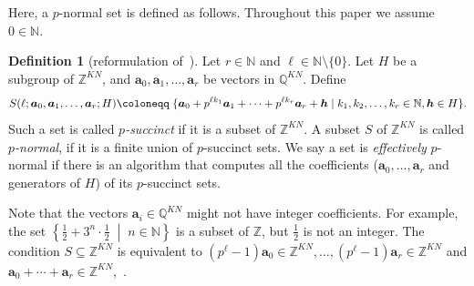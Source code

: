 \documentclass[letterpaper, 11pt, thm-restate]{article}
\numberwithin{equation}{section}
\newcommand{\Z}{\mathbb{Z}}
\newcommand{\N}{\mathbb{N}}
\newcommand{\Q}{\mathbb{Q}}
\newcommand{\ba}{\boldsymbol{a}}
\newcommand{\bc}{\boldsymbol{c}}
\newcommand{\bh}{\boldsymbol{h}}
\newcommand{\red}{\textcolor{red}}
\theoremstyle{definition}
\newtheorem{defn}[thrm]{Definition}
\theoremstyle{definition}
\theoremstyle{definition}
\begin{document}
Here, a $p$-normal set is defined as follows. Throughout this paper we assume $0 \in \N$.

\begin{defn}[{reformulation of~\cite{derksen2015linear}}]\label{def:pnormal}
    Let $r \in \N$ and $\ell \in \N \setminus \{0\}$.
    Let $H$ be a subgroup of $\Z^{KN}$, and $\ba_0, \ba_1, \ldots, \ba_r$ be vectors in $\Q^{KN}$.
    Define
    \begin{equation}\label{eq:psuccinct}
    S(\ell; \ba_0, \ba_1, \ldots, \ba_r; H) \\
        \coloneqq \; \{\ba_0 + p^{\ell k_1} \ba_1 + \cdots + p^{\ell k_r} \ba_r + \bh \mid k_1, k_2, \ldots, k_r \in \N, \bh \in H\}.
    \end{equation}
    Such a set is called \emph{$p$-succinct} if it is a subset of $\Z^{KN}$.
    A subset $S$ of $\Z^{KN}$ is called \emph{$p$-normal}, if it is a finite union of $p$-succinct sets. %
    We say a set is \emph{effectively} $p$-normal if there is an algorithm that computes all the coefficients ($\ba_0, \ldots, \ba_r$ and generators of $H$) of its $p$-succinct sets.
\end{defn}

Note that the vectors $\ba_i \in \Q^{KN}$ might not have integer coefficients. For example, the set $\left\{\frac{1}{2} + 3^n \cdot \frac{1}{2}\;\middle|\; n \in \N\right\}$ is a subset of $\Z$, but $\frac{1}{2}$ is not an integer. 
The condition $S \subseteq \Z^{KN}$ is equivalent to $(p^{\ell} - 1)\ba_0 \in \Z^{KN}, \ldots, (p^{\ell} - 1)\ba_r \in \Z^{KN}$ and $\ba_0 + \cdots + \ba_r \in \Z^{KN}$,~\cite[p.117]{derksen2015linear}.
\end{document}

